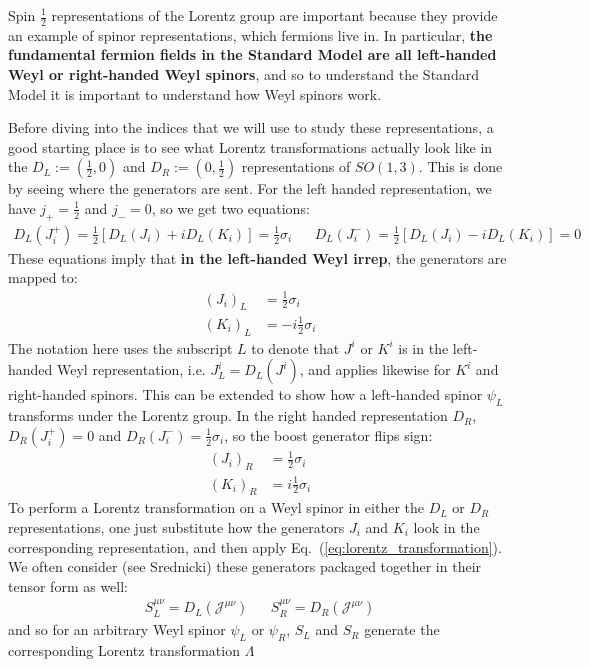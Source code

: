 \documentclass[11pt, oneside]{article}   	%
\theoremstyle{definition}
\begin{document}
 Spin $\frac{1}{2}$ representations of the Lorentz group are important because they provide an example of spinor representations, 
 which fermions live in. In particular, \textbf{the fundamental fermion fields in the Standard Model are all left-handed Weyl or right-handed 
 Weyl spinors}, and so to understand the Standard Model it is important to understand how Weyl spinors work. 
 
Before diving into the indices that we will use to study these representations, a good starting place is to see what Lorentz transformations 
actually look like in the $D_L := (\frac{1}{2}, 0)$ and $D_R := (0, \frac{1}{2})$ representations of $SO(1, 3)$. This is done by seeing where 
the generators are sent. For the left handed representation, we have $j_+ = \frac{1}{2}$ and $j_- = 0$, so we get two equations:
\begin{align}
	D_L(J^+_i) = \frac{1}{2}\left[D_L(J_i) + i D_L(K_i)\right] = \frac{1}{2}\sigma_i && D_L(J^-_i) = \frac{1}{2}\left[ D_L(J_i) - i D_L(K_i) \right] = 
	0
\end{align}
These equations imply that \textbf{in the left-handed Weyl irrep}, the generators are mapped to:
\begin{align}
	(J_i)_L &= \frac{1}{2}\sigma_i \\
	(K_i)_L &= -i\frac{1}{2}\sigma_i
\end{align}
The notation here uses the subscript $L$ to denote that $J^i$ or $K^i$ is in the left-handed Weyl representation, i.e. 
$J_L^i = D_L(J^i)$, and applies likewise for $K^i$ and right-handed spinors. 
This can be extended to show how a left-handed spinor $\psi_L$ transforms under the Lorentz group. In the right handed representation 
$D_R$, $D_R(J_i^+) = 0$ and $D_R(J_i^-) = \frac{1}{2}\sigma_i$, so the boost generator flips sign:
\begin{align}
	(J_i)_R &= \frac{1}{2}\sigma_i \\
	(K_i)_R &= i\frac{1}{2}\sigma_i
\end{align}
To perform a Lorentz transformation on a Weyl spinor in either the $D_L$ or $D_R$ representations, one just substitute how the generators 
$J_i$ and $K_i$ look in the corresponding representation, and then apply Eq.~(\ref{eq:lorentz_transformation}). We often consider 
(see Srednicki) these generators packaged together in their tensor form as well:
\begin{align}
	S_L^{\mu\nu} = D_L(\mathcal{J}^{\mu\nu}) && S_R^{\mu\nu} = D_R(\mathcal{J}^{\mu\nu})
\end{align}
and so for an arbitrary Weyl spinor $\psi_L$ or $\psi_R$, $S_L$ and $S_R$ generate the corresponding Lorentz transformation $\Lambda$ 
\end{document}
